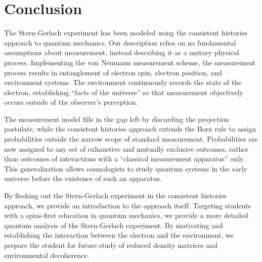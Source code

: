 \chapter{Conclusion}
The Stern-Gerlach experiment has been modeled using the consistent histories approach to quantum mechanics. Our description relies on no fundamental assumptions about measurement, instead describing it as a unitary physical process. Implementing the von Neumann measurement scheme, the measurement process results in entanglement of electron spin, electron position, and environment systems. The environment continuously records the state of the electron, establishing ``facts of the universe'' so that measurement objectively occurs outside of the observer's perception.

The measurement model fills in the gap left by discarding the projection postulate, while the consistent histories approach extends the Born rule to assign probabilities outside the narrow scope of standard measurement. Probabilities are now assigned to any set of exhaustive and mutually exclusive outcomes, rather than outcomes of interactions with a ``classical measurement apparatus'' only. This generalization allows cosmologists to study quantum systems in the early universe before the existence of such an apparatus.

By fleshing out the Stern-Gerlach experiment in the consistent histories approach, we provide an introduction to the approach itself. Targeting students with a spins-first education in quantum mechanics, we provide a more detailed quantum analysis of the Stern-Gerlach experiment. By motivating and establishing the interaction between the electron and the environment, we prepare the student for future study of reduced density matrices and environmental decoherence.

{}





